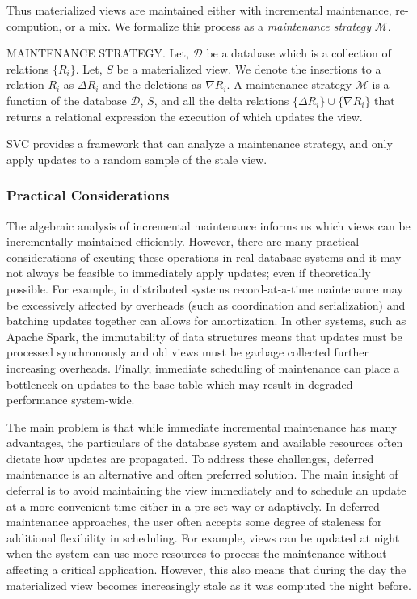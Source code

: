 Thus materialized views are maintained either with incremental maintenance, re-compution, or a mix.
We formalize this process as a \emph{maintenance strategy} $\mathcal{M}$.
\begin{definition} MAINTENANCE STRATEGY.
Let, $\mathcal{D}$ be a database which is a collection of relations $\{R_i\}$.
Let, $S$ be a materialized view.
We denote the insertions to a relation $R_i$ as $\Delta R_i$ and the deletions as $\nabla R_i$.
A maintenance strategy $\mathcal{M}$ is a function of the database $\mathcal{D}$, $S$, and all the delta relations $\{\Delta R_i\} \cup \{\nabla R_i\}$ that returns a relational expression the execution of which updates the view.
\end{definition}

SVC provides a framework that can analyze a maintenance strategy, and only apply updates to a random sample of the stale view.

\subsubsection{Practical Considerations}
The algebraic analysis of incremental maintenance \cite{DBLP:journals/vldb/KochAKNNLS14, DBLP:conf/pods/Koch10} informs us which views can be incrementally maintained efficiently.
However, there are many practical considerations of excuting these operations in real database systems and it may not always be feasible to immediately apply updates; even if theoretically possible.
For example, in distributed systems record-at-a-time maintenance may be excessively affected by overheads (such as coordination and serialization) and batching updates together can allows for amortization.
In other systems, such as Apache Spark, the immutability of data structures means that updates must be processed synchronously and old views must be garbage collected further increasing overheads.
Finally, immediate scheduling of maintenance can place a bottleneck on updates to the base table which may result in degraded performance system-wide.

The main problem is that while immediate incremental maintenance has many advantages, the particulars of the database system and available resources often dictate how updates are propagated.
To address these challenges, deferred maintenance is an alternative and often preferred solution.
The main insight of deferral is to avoid maintaining the view immediately and to schedule an update at a more convenient time either in a pre-set way or adaptively.
In deferred maintenance approaches, the user often accepts some degree of staleness for additional flexibility in scheduling.
For example, views can be updated at night when the system can use more resources to process the maintenance without affecting a critical application.
However, this also means that during the day the materialized view becomes increasingly stale as it was computed the night before.

